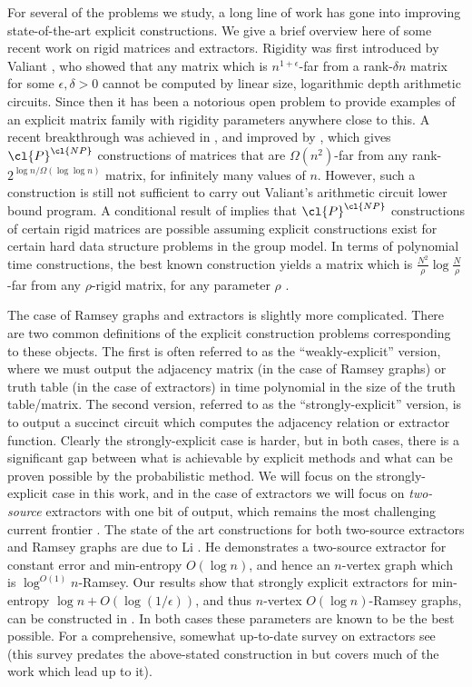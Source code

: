For several of the problems we study, a long line of work has gone into improving state-of-the-art explicit constructions. We give a brief overview here of some recent work on rigid matrices and extractors. Rigidity was first introduced by Valiant \cite{Valiant}, who showed that any matrix which is $n^{1+\epsilon}$-far from a rank-$\delta n$ matrix for some $\epsilon, \delta > 0$ cannot be computed by linear size, logarithmic depth arithmetic circuits. Since then it has been a notorious open problem to provide examples of an explicit matrix family with rigidity parameters anywhere close to this. A recent breakthrough was achieved in \cite{alman-chen}, and improved by \cite{pcp-rigidity}, which gives $\cl{P}^\cl{NP}$ constructions of matrices that are $\Omega(n^2)$-far from any rank-$2^{\log n/\Omega(\log \log n)}$ matrix, for infinitely many values of $n$. However, such a construction is still not sufficient to carry out Valiant's arithmetic circuit lower bound program. A conditional result of \cite{data-structure-rigidity} implies that $\cl{P}^\cl{NP}$ constructions of certain rigid matrices are possible assuming explicit constructions exist for certain  hard data structure problems in the group model. In terms of polynomial time constructions, the best known construction yields a matrix which is $\frac{N^2}{\rho}\log{\frac{N}{\rho}}$-far from any $\rho$-rigid matrix, for any parameter $\rho$ \cite{SSS}\cite{Friedman}.

The case of Ramsey graphs and extractors is slightly more complicated. There are two common definitions of the explicit construction problems corresponding to these objects. The first is often referred to as the ``weakly-explicit'' version, where we must output the adjacency matrix (in the case of Ramsey graphs) or truth table (in the case of extractors) in time polynomial in the size of the truth table/matrix. The second version, referred to as the ``strongly-explicit'' version, is to output a succinct circuit which computes the adjacency relation or extractor function. Clearly the strongly-explicit case is harder, but in both cases, there is a significant gap between what is achievable by explicit methods and what can be proven possible by the probabilistic method. We will focus on the strongly-explicit case in this work, and in the case of extractors we will focus on \emph{two-source} extractors with one bit of output, which remains the most challenging current frontier \cite{extractors-survey}. The state of the art constructions for both two-source extractors and Ramsey graphs are due to Li \cite{new-li-extractor}. He demonstrates a two-source extractor for constant error and min-entropy $O(\log n)$, and hence an $n$-vertex graph which is $\log^{O(1)}n$-Ramsey. Our results show that strongly explicit extractors for min-entropy $\log n + O(\log(1/\epsilon))$, and thus $n$-vertex $O(\log n)$-Ramsey graphs, can be constructed in . In both cases these parameters are known to be the best possible. For a comprehensive, somewhat up-to-date survey on extractors see \cite{extractors-survey} (this survey predates the above-stated construction in \cite{new-li-extractor} but covers much of the work which lead up to it).

